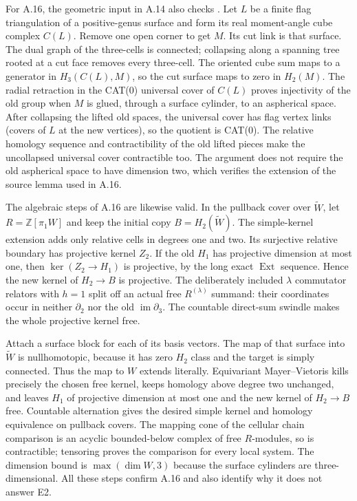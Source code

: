 For A.16, the geometric input in A.14 also checks
\cite[Section~6]{EBartholdiMikhailov2026}. Let $L$
be a finite flag triangulation of a positive-genus surface
and form its real moment-angle cube complex $C(L)$. Remove
one open corner to get $M$. Its cut link is that surface.
The dual graph of the three-cells is connected; collapsing
along a spanning tree rooted at a cut face removes every
three-cell. The oriented cube sum maps to a generator in
$H_3(C(L),M)$, so the cut surface maps to zero in $H_2(M)$.
The radial retraction in the CAT(0) universal cover of
$C(L)$ proves injectivity of the old group when $M$ is
glued, through a surface cylinder, to an aspherical space.
After collapsing the lifted old spaces, the universal cover
has flag vertex links (covers of $L$ at the new vertices),
so the quotient is CAT(0). The relative homology sequence
and contractibility of the old lifted pieces make the
uncollapsed universal cover contractible too. The argument
does not require the old aspherical space to have dimension
two, which verifies the extension of the source lemma used
in A.16.

The algebraic steps of A.16 are likewise valid. In the
pullback cover over $\widetilde W$, let
$R=\mathbb Z[\pi_1W]$ and keep the initial copy
$B=H_2(\widetilde W)$. The simple-kernel extension adds
only relative cells in degrees one and two. Its surjective
relative boundary has projective kernel $Z_2$. If the old
$H_1$ has projective dimension at most one, then
$\ker(Z_2\to H_1)$ is projective, by the long exact
$\operatorname{Ext}$ sequence. Hence the new kernel of
$H_2\to B$ is projective. The deliberately included
$\lambda$ commutator relators with $h=1$ split off an
actual free $R^{(\lambda)}$ summand: their coordinates
occur in neither $\partial_2$ nor the old
$\operatorname{im}\partial_3$. The countable direct-sum
swindle makes the whole projective kernel free.

Attach a surface block for each of its basis vectors.
The map of that surface into $\widetilde W$ is nullhomotopic,
because it has zero $H_2$ class and the target is simply
connected. Thus the map to $W$ extends literally. Equivariant
Mayer--Vietoris kills precisely the chosen free kernel,
keeps homology above degree two unchanged, and leaves
$H_1$ of projective dimension at most one and the new
kernel of $H_2\to B$ free. Countable alternation gives
the desired simple kernel and homology equivalence on
pullback covers. The mapping cone of the cellular chain
comparison is an acyclic bounded-below complex of free
$R$-modules, so is contractible; tensoring proves the
comparison for every local system. The dimension bound
is $\max(\dim W,3)$ because the surface cylinders are
three-dimensional. All these steps confirm A.16 and
also identify why it does not answer E2.

